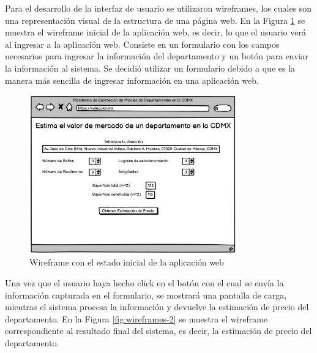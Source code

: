 Para el desarrollo de la interfaz de usuario se utilizaron wireframes, los
cuales son una representación visual de la estructura de una página web. En la
Figura \ref{fig:wireframes} se muestra el wireframe inicial de la aplicación
web, es decir, lo que el usuario verá al ingresar a la aplicación web. Consiste
en un formulario con los campos necesarios para ingresar la información del
departamento y un botón para enviar la información al sistema. Se decidió
utilizar un formulario debido a que es la manera más sencilla de ingresar
información en una aplicación web.

\begin{figure}[H]
    \centering
    \includegraphics[width=0.8\textwidth]{imagenes/04-diseno/wireframe-1.png}
    \caption{Wireframe con el estado inicial de la aplicación web}
    \label{fig:wireframes}
\end{figure}

Una vez que el usuario haya hecho click en el botón con el cual se envía la
información capturada en el formulario, se mostrará una pantalla de carga,
mientras el sistema procesa la información y devuelve la estimación de precio
del departamento. En la Figura \ref{fig:wireframes-2} se muestra el wireframe
correspondiente al resultado final del sistema, es decir, la estimación de
precio del departamento.

